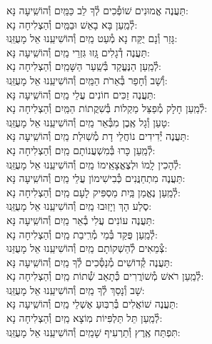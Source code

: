 \documentclass[twoside, openany, parskip=half, 11pt]{book}
\begin{document}
\begin{small}
תַּעֲנֶה אֱמוּנִים שׁוֹפְ֯כִים לְ֯ךָ לֵב כַּמַּֽיִם \hfill וְ֯הוֹשִֽׁיעָה נָּא:\\
לְ֯מַֽעַן בָּא בָאֵשׁ וּבַמַּֽיִם \hfill וְ֯הַצְלִיחָה נָא: \\
גָּזַר וְ֯נָם יֻקַּח נָא מְ֯עַט מַֽיִם \hfill וְ֯הוֹשִׁיעֵֽנוּ אֵל מָעֻזֵּֽנוּ:\\
תַּעֲנֶה דְ֯גָלִים גָּֽזוּ גִּזְרֵי מַֽיִם \hfill וְ֯הוֹשִֽׁיעָה נָּא:\\
לְ֯מַֽעַן הַנֶּעֱקַד בְּ֯שַֽׁעַר הַשָּׁמַֽיִם \hfill וְ֯הַצְלִיחָה נָא:\\
וְ֯שָׁב וְ֯חָפַר בְּ֯אֵרֹת הַמַּֽיִם \hfill וְ֯הוֹשִׁיעֵֽנוּ אֵל מָעֻזֵּֽנוּ:\\
תַּעֲנֶה זַכִּים חוֹנִים עֲלֵי מַֽיִם \hfill וְ֯הוֹשִֽׁיעָה נָּא:\\
לְ֯מַֽעַן חָלָק מְ֯פַצֵּל מַקְלוֹת בְּ֯שִׁקֲתוֹת הַמַּֽיִם \hfill וְ֯הַצְלִיחָה נָא:\\
טָעַן וְ֯גָל אֶֽבֶן מִבְּ֯אֵר מַֽיִם \hfill וְ֯הוֹשִׁיעֵֽנוּ אֵל מָעֻזֵּֽנוּ:\\
תַּעֲנֶה יְ֯דִידִים נוֹחֲלֵי דָת מְ֯שֽׁוּלַת מַֽיִם \hfill וְ֯הוֹשִֽׁיעָה נָּא: \\
לְ֯מַֽעַן כָּרוּ בְּ֯מִשְׁעֲנוֹתָם מַֽיִם \hfill וְ֯הַצְלִיחָה נָא:\\
לְ֯הָכִין לָֽמוֹ וּלְצֶאֱצָאֵֽימוֹ מַֽיִם \hfill וְ֯הוֹשִׁיעֵֽנוּ אֵל מָעֻזֵּֽנוּ:\\
תַּעֲנֶה מִתְחַנֲּנִים כְּ֯בִישִׁימוֹן עֲלֵי מַֽיִם \hfill וְ֯הוֹשִֽׁיעָה נָּא:\\
לְ֯מַֽעַן נֶאֱמַן בַּֽיִת מַסְפִּיק לָעָם מַֽיִם \hfill וְ֯הַצְלִיחָה נָא:\\
סֶלַע הָךְ וַיָזֽוּבוּ מַֽיִם \hfill וְ֯הוֹשִׁיעֵֽנוּ אֵל מָעֻזֵּֽנוּ: \\
תַּעֲנֶה עוֹנִים עֲלִי בְ֯אֵר מַֽיִם \hfill וְ֯הוֹשִֽׁיעָה נָּא: \\
לְ֯מַֽעַן פֻּקַּד בְּ֯מֵי מְ֯רִֽיבַת מַֽיִם \hfill וְ֯הַצְלִיחָה נָא:\\
צְ֯מֵאִים לְ֯הַשְׁקוֹתָם מַֽיִם \hfill וְ֯הוֹשִׁיעֵֽנוּ אֵל מָעֻזֵּנוּ: \\
תַּעֲנֶה קְ֯דוֹשִׁים מְ֯נַסְּ֯כִים לְ֯ךָ מַֽיִם \hfill וְ֯הוֹשִֽׁיעָה נָּא: \\
לְ֯מַֽעַן רֹאשׁ מְ֯שׁוֹרֲרִים כְּ֯תָאַב שְׁ֯תוֹת מַֽיִם \hfill וְ֯הַצְלִיחָה נָא:\\
שָׁב וְ֯נָסַךְ לְ֯ךָ מַֽיִם \hfill וְ֯הוֹשִׁיעֵֽנוּ אֵל מָעֻזֵּֽנוּ:\\
תַּעֲנֶה שׁוֹאֲלִים בְּ֯רִבּֽוּעַ אֶשְׁלֵי מַֽיִם \hfill וְ֯הוֹשִֽׁיעָה נָּא: \\
לְ֯מַֽעַן תֵּל תַּלְפִּיוֹת מֽוֹצָא מַֽיִם \hfill וְ֯הַצְלִיחָה נָא:\\
תִּפְתַּח אֶֽרֶץ וְ֯תַרְעִיף שָׁמַֽיִם \hfill וְ֯הוֹשִׁיעֵֽנוּ אֵל מָעֻזֵּֽנוּ:

\end{small}
\end{document}
